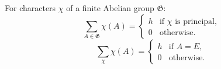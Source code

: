 For characters $\chi$ of a finite Abelian group $\mathfrak{G}$:
$$\sum_{A \in \mathfrak{G}} \chi(A) = \begin{cases} h & \text{if } \chi \text{ is principal}, \\ 0 & \text{otherwise.} \end{cases}$$
$$\sum_{\chi} \chi(A) = \begin{cases} h & \text{if } A = E, \\ 0 & \text{otherwise.} \end{cases}$$
